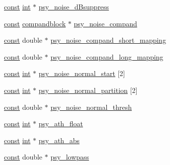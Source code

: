 \begin{DoxyCompactItemize}
\item 
\hyperlink{getopt1_8c_a2c212835823e3c54a8ab6d95c652660e}{const} \hyperlink{xmltok_8h_a5a0d4a5641ce434f1d23533f2b2e6653}{int} $\ast$ \hyperlink{structve__setup__data__template_aa823dca2160d992c5d1f6afb78a4eaf1}{psy\+\_\+noise\+\_\+d\+Bsuppress}
\item 
\hyperlink{getopt1_8c_a2c212835823e3c54a8ab6d95c652660e}{const} \hyperlink{structcompandblock}{compandblock} $\ast$ \hyperlink{structve__setup__data__template_a3ee279d169ec91f8706ad782a0adb2a0}{psy\+\_\+noise\+\_\+compand}
\item 
\hyperlink{getopt1_8c_a2c212835823e3c54a8ab6d95c652660e}{const} double $\ast$ \hyperlink{structve__setup__data__template_a072110b97ea5be01effaddb650a609c5}{psy\+\_\+noise\+\_\+compand\+\_\+short\+\_\+mapping}
\item 
\hyperlink{getopt1_8c_a2c212835823e3c54a8ab6d95c652660e}{const} double $\ast$ \hyperlink{structve__setup__data__template_a4af20dd3d400ad5f70bef2344aa4d9d9}{psy\+\_\+noise\+\_\+compand\+\_\+long\+\_\+mapping}
\item 
\hyperlink{getopt1_8c_a2c212835823e3c54a8ab6d95c652660e}{const} \hyperlink{xmltok_8h_a5a0d4a5641ce434f1d23533f2b2e6653}{int} $\ast$ \hyperlink{structve__setup__data__template_a47f4c1644c2a39cbfd8d812a43506afa}{psy\+\_\+noise\+\_\+normal\+\_\+start} \mbox{[}2\mbox{]}
\item 
\hyperlink{getopt1_8c_a2c212835823e3c54a8ab6d95c652660e}{const} \hyperlink{xmltok_8h_a5a0d4a5641ce434f1d23533f2b2e6653}{int} $\ast$ \hyperlink{structve__setup__data__template_a12a6cccfe5870aef136c233391995404}{psy\+\_\+noise\+\_\+normal\+\_\+partition} \mbox{[}2\mbox{]}
\item 
\hyperlink{getopt1_8c_a2c212835823e3c54a8ab6d95c652660e}{const} double $\ast$ \hyperlink{structve__setup__data__template_a178d559e9a7fa8a6f66f4905fad95574}{psy\+\_\+noise\+\_\+normal\+\_\+thresh}
\item 
\hyperlink{getopt1_8c_a2c212835823e3c54a8ab6d95c652660e}{const} \hyperlink{xmltok_8h_a5a0d4a5641ce434f1d23533f2b2e6653}{int} $\ast$ \hyperlink{structve__setup__data__template_a1359dd7c84320f1350da647144689f87}{psy\+\_\+ath\+\_\+float}
\item 
\hyperlink{getopt1_8c_a2c212835823e3c54a8ab6d95c652660e}{const} \hyperlink{xmltok_8h_a5a0d4a5641ce434f1d23533f2b2e6653}{int} $\ast$ \hyperlink{structve__setup__data__template_a39b6e113004df487a5155c4d7b3faee5}{psy\+\_\+ath\+\_\+abs}
\item 
\hyperlink{getopt1_8c_a2c212835823e3c54a8ab6d95c652660e}{const} double $\ast$ \hyperlink{structve__setup__data__template_ae8d4049ce7ae8ad4a8b6f739b80f56bd}{psy\+\_\+lowpass}

\end{DoxyCompactItemize}
